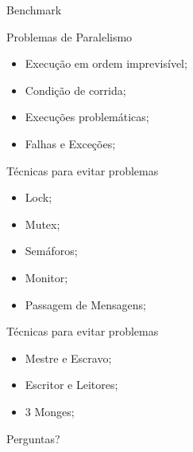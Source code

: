 \documentclass[10pt]{beamer}
\begin{document}
\begin{frame}{Benchmark}
	\begin{figure}
	\end{figure}
\end{frame}

\begin{frame}{Problemas de Paralelismo}
	\begin{itemize}
		\item Execução em ordem imprevisível;
		\item Condição de corrida;
		\item Execuções problemáticas;
		\item Falhas e Exceções;
	\end{itemize}
\end{frame}

\begin{frame}{Técnicas para evitar problemas}
	\begin{itemize}
		\item Lock;
		\item Mutex;
		\item Semáforos;
		\item Monitor;
		\item Passagem de Mensagens;
	\end{itemize}
\end{frame}

\begin{frame}{Técnicas para evitar problemas}
	\begin{itemize}
		\item Mestre e Escravo;
		\item Escritor e Leitores;
		\item 3 Monges;
		\end{itemize}
\end{frame}

\begin{frame}[standout]
  Perguntas?
\end{frame}
\end{document}
